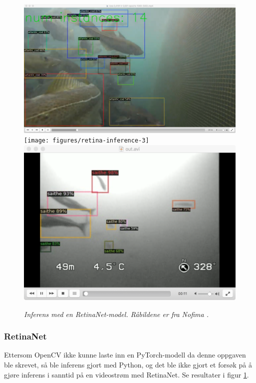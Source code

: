 \begin{figure}
\begin{center} 
\includegraphics[scale=0.25]{figures/retina-inference-1}
\texttt{[image: figures/retina-inference-3]}
\includegraphics[scale=0.35]{figures/retinanet_inference_saithe}
\caption{\small \sl Inferens med en RetinaNet-model. Råbildene er fra Nofima \cite{Nofima 2020}. \label{fig:inference}} 
\end{center} 
\end{figure} 

\subsubsection{RetinaNet}

Ettersom OpenCV ikke kunne laste inn en PyTorch-modell da denne oppgaven ble skrevet, så ble inferens gjort med Python, og det ble ikke gjort et forsøk på å gjøre inferens i sanntid på en videostrøm med RetinaNet. Se resultater i figur \ref{fig:inference}.

